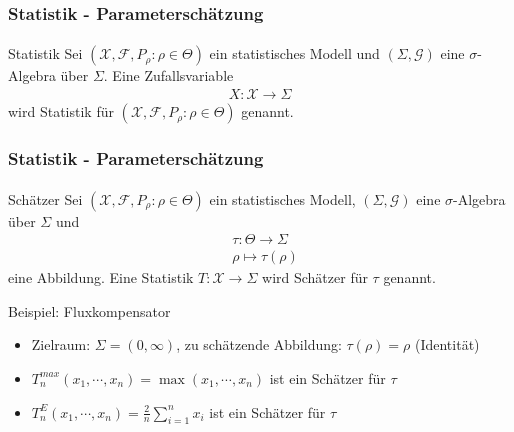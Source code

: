 \documentclass{beamer}
\begin{document}
\begin{frame}
    \frametitle{Statistik - Parameterschätzung}
\framesubtitle{}

\begin{block}{Statistik}
Sei   $(\mathcal{X}, \mathcal{F}, P_\rho :  \rho \in\Theta)$ ein statistisches Modell und $(\Sigma, \mathcal{G})$ eine $\sigma$-Algebra über $\Sigma$. Eine Zufallsvariable 
\begin{align*}
X : \mathcal{X} \to \Sigma
\end{align*}
wird Statistik für  $(\mathcal{X}, \mathcal{F}, P_\rho :  \rho \in \Theta)$  genannt.
\end{block}
 \end{frame}



\begin{frame}
    \frametitle{Statistik - Parameterschätzung}
\framesubtitle{}

\begin{block}{Schätzer}
Sei   $(\mathcal{X}, \mathcal{F}, P_\rho :  \rho \in \Theta)$ ein statistisches Modell, $(\Sigma, \mathcal{G})$ eine $\sigma$-Algebra über $\Sigma$ und  
\begin{align*}
& \tau : \Theta \to \Sigma \\
 & \rho \mapsto \tau(\rho) 
\end{align*}
eine Abbildung. Eine Statistik   $T: \mathcal{X} \to \Sigma$  wird Schätzer für $\tau$ genannt.
\end{block}

\begin{block}{Beispiel: Fluxkompensator}
\begin{itemize}
\item Zielraum: $\Sigma = (0, \infty)$, zu schätzende Abbildung: $\tau(\rho) = \rho$ (Identität)
\item $T_n^{max}(x_1, \cdots, x_n) = \max(x_1, \cdots, x_n)$ ist ein Schätzer für $\tau$
\item $T_n^{E}(x_1, \cdots, x_n) = \frac{2}{n} \sum_{i=1}^n x_i$ ist ein Schätzer für $\tau$
\end{itemize}
\end{block}
 \end{frame}
\end{document}

